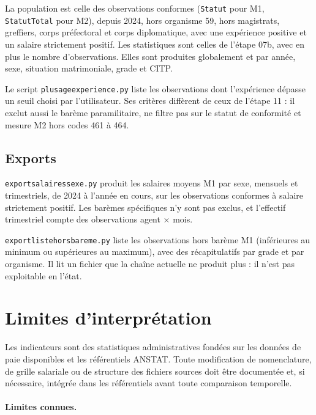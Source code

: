 \documentclass[12pt,a4paper,french]{article}
\renewcommand{\_}{\underscoreorigine\allowbreak}
\begin{document}
La population est celle des observations conformes (\texttt{Statut} pour M1, \texttt{Statut\_Total} pour M2), depuis 2024, hors organisme 59, hors magistrats, greffiers, corps préfectoral et corps diplomatique, avec une expérience positive et un salaire strictement positif. Les statistiques sont celles de l'étape 07b, avec en plus le nombre d'observations. Elles sont produites globalement et par année, sexe, situation matrimoniale, grade et CITP.

Le script \texttt{plus\_age\_experience.py} liste les observations dont l'expérience dépasse un seuil choisi par l'utilisateur. Ses critères diffèrent de ceux de l'étape 11 : il exclut aussi le barème paramilitaire, ne filtre pas sur le statut de conformité et mesure M2 hors codes 461 à 464.

\subsection{Exports}

\texttt{export\_salaires\_sexe.py} produit les salaires moyens M1 par sexe, mensuels et trimestriels, de 2024 à l'année en cours, sur les observations conformes à salaire strictement positif. Les barèmes spécifiques n'y sont pas exclus, et l'effectif trimestriel compte des observations agent $\times$ mois.

\texttt{export\_liste\_hors\_bareme.py} liste les observations hors barème M1 (inférieures au minimum ou supérieures au maximum), avec des récapitulatifs par grade et par organisme. Il lit un fichier que la chaîne actuelle ne produit plus : il n'est pas exploitable en l'état.

\section{Limites d'interprétation}

\begin{warningbox}
Les indicateurs sont des statistiques administratives fondées sur les données de paie disponibles et les référentiels ANSTAT. Toute modification de nomenclature, de grille salariale ou de structure des fichiers sources doit être documentée et, si nécessaire, intégrée dans les référentiels avant toute comparaison temporelle.
\end{warningbox}

\paragraph{Limites connues.}
\end{document}
